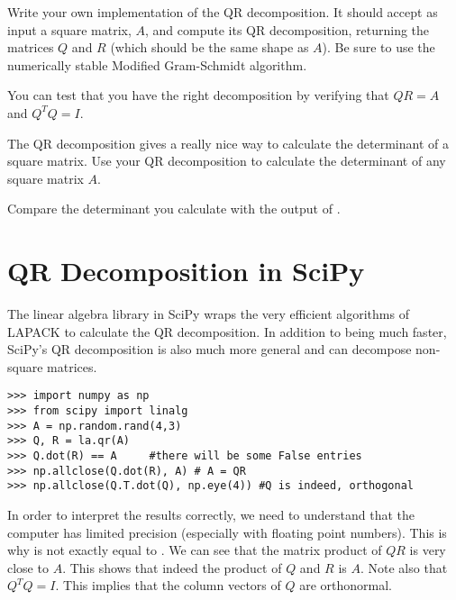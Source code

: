 \begin{problem}
\label{prob:QR}
Write your own implementation of the QR decomposition.  
It should accept as input a square matrix, $A$, and compute its QR decomposition, returning the matrices $Q$ and $R$ (which should be the same shape as $A$). 
Be sure to use the numerically stable Modified Gram-Schmidt algorithm.

You can test that you have the right decomposition by verifying that $QR=A$ and $Q^T Q = I$.
\end{problem}

\begin{problem}
The QR decomposition gives a really nice way to calculate the determinant of a square matrix.
Use your QR decomposition to calculate the determinant of any square matrix $A$.

Compare the determinant you calculate with the output of .
\end{problem}

\section*{QR Decomposition in SciPy}
The linear algebra library in SciPy wraps the very efficient algorithms of LAPACK to calculate the QR decomposition.
In addition to being much faster, SciPy's QR decomposition is also much more general and can decompose non-square matrices.
\begin{lstlisting}
>>> import numpy as np
>>> from scipy import linalg
>>> A = np.random.rand(4,3)
>>> Q, R = la.qr(A)
>>> Q.dot(R) == A     #there will be some False entries
>>> np.allclose(Q.dot(R), A) # A = QR
>>> np.allclose(Q.T.dot(Q), np.eye(4)) #Q is indeed, orthogonal
\end{lstlisting}

In order to interpret the results correctly, we need to understand that the computer has limited precision (especially with floating point numbers). 
This is why  is not exactly equal to .  
We can see that the matrix product of $QR$ is very close to $A$.
This shows that indeed the product of $Q$ and $R$ is $A$.  
Note also that $Q^T Q = I$.  
This implies that the column vectors of $Q$ are orthonormal.


